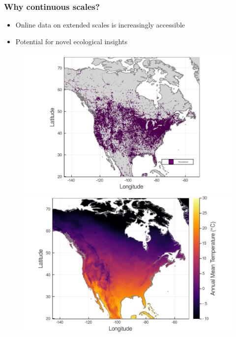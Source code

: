 \documentclass[10pt, aspectratio=1610]{beamer}
\begin{document}
\begin{frame}
  \frametitle{Why continuous scales?}
  \begin{itemize}
    \item Online data on extended scales is increasingly accessible
    \item Potential for novel ecological insights
  \end{itemize}
  \begin{figure}
    \centering
    \hspace*{-1cm}\includegraphics[scale=0.12]{fig/01_raw_singlesp.png}%
    \includegraphics[scale=0.12]{fig/wc_temp.png}
  \end{figure}
\end{frame}
\end{document}
